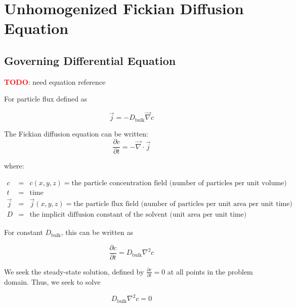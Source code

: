 
\section{Unhomogenized Fickian Diffusion Equation}\label{sec:unhom_fick}

\subsection{Governing Differential Equation}\label{subsec:unhom_fick_gov}

\textcolor{red}{\textbf{TODO}}: need equation reference


For particle flux defined as 

\begin{equation}
\vec{j} = - D_{\mathrm{bulk}} \vec{\nabla} c
\end{equation}

The Fickian diffusion equation can be written:
\begin{equation}
\frac{\partial c}{\partial t} = - \vec{\nabla} \cdot \vec{j}
\end{equation}

where:

$\begin{array}{rcl}
c & = & c(x,y,z) = \text{the particle concentration field (number of particles per unit volume)} \\
t & = & \text{time} \\
\vec{j} & = & \vec{j}(x,y,z) = \text{the particle flux field (number of particles per unit area per unit time)} \\
D & = & \text{the implicit diffusion constant of the solvent (unit area per unit time)}
\end{array}$

For constant $D_{\mathrm{bulk}}$, this can be written as

\begin{equation}
\frac{\partial c}{\partial t} = D_{\mathrm{bulk}} \nabla^2 c
\end{equation}

We seek the steady-state solution, defined by
$\frac{\partial c}{\partial t} = 0$ at all points in the problem domain.
Thus, we seek to solve

\begin{equation}
D_{\mathrm{bulk}} \nabla^2 c = 0
\end{equation}

